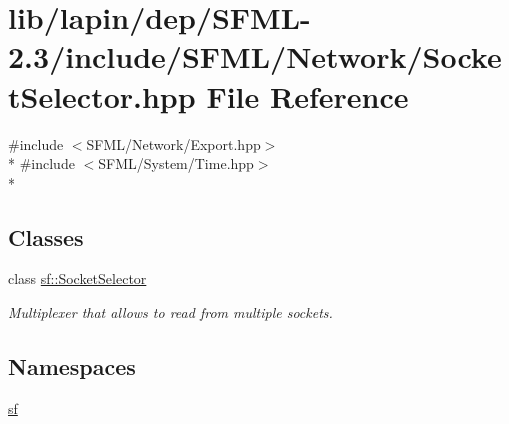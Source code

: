 \hypertarget{lapin_2dep_2_s_f_m_l-2_83_2include_2_s_f_m_l_2_network_2_socket_selector_8hpp}{\section{lib/lapin/dep/\-S\-F\-M\-L-\/2.3/include/\-S\-F\-M\-L/\-Network/\-Socket\-Selector.hpp File Reference}
\label{lapin_2dep_2_s_f_m_l-2_83_2include_2_s_f_m_l_2_network_2_socket_selector_8hpp}
}
{\ttfamily \#include $<$S\-F\-M\-L/\-Network/\-Export.\-hpp$>$}\\*
{\ttfamily \#include $<$S\-F\-M\-L/\-System/\-Time.\-hpp$>$}\\*
\subsection*{Classes}
\begin{DoxyCompactItemize}
\item 
class \hyperlink{classsf_1_1_socket_selector}{sf\-::\-Socket\-Selector}
\begin{DoxyCompactList}\small\item\em Multiplexer that allows to read from multiple sockets. \end{DoxyCompactList}\end{DoxyCompactItemize}
\subsection*{Namespaces}
\begin{DoxyCompactItemize}
\item 
\hyperlink{namespacesf}{sf}
\end{DoxyCompactItemize}
